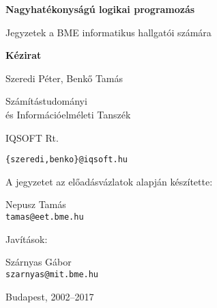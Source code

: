 \vspace*{3cm}
\thispagestyle{empty}

\centerline{\Huge\bf Nagyhatékonyságú logikai programozás}

\vspace{0.5cm}

\centerline{\Large  Jegyzetek a BME informatikus hallgatói számára}
\vspace{1cm}

\centerline{\large\bf Kézirat}
\vfill


\begin{center}
{\Large Szeredi Péter, Benk{\H o} Tamás
	\vspace{0.3cm}
	
	Számítástudományi\\
	és Információelméleti Tanszék
	\vspace{0.3cm}
	
	IQSOFT Rt.}
\vspace{0.3cm}

{\large\tt \{szeredi,benko\}@iqsoft.hu}

\vspace{2cm}

{\large A jegyzetet az előadásvázlatok alapján készítette:\\
	
	\vspace{0.3cm}
	
	\Large Nepusz Tamás \\
	\vspace{0.3cm}
	{\large\tt tamas@eet.bme.hu}
}

\vspace{1cm}

{\large Javítások:\\

	\vspace{0.3cm}

	\Large Szárnyas Gábor \\
	\vspace{0.3cm}
	{\large\tt szarnyas@mit.bme.hu}
}
	
\end{center}

\vspace{3cm}

\centerline{\large Budapest, 2002--2017}

\clearpage
